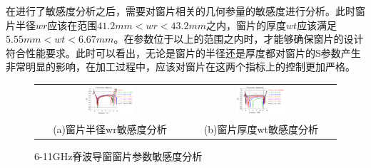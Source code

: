 \documentclass[master]{thesis-uestc}
\begin{document}
在进行了敏感度分析之后，需要对窗片相关的几何参量的敏感度进行分析。此时窗片半径\(wr\)应该在范围\(41.2mm<wr<43.2mm\)之内，窗片的厚度\(wt\)应该满足\(5.55mm<wt<6.67mm\)。在参数位于以上的范围之内时，才能够确保窗片的设计符合性能要求。此时可以看出，无论是窗片的半径还是厚度都对窗片的S参数产生非常明显的影响，在加工过程中，应该对窗片在这两个指标上的控制更加严格。
\begin{figure}[!htb]
    \small
    \centering
    \begin{tabular}{@{\ }c@{\ }c}
        \includegraphics[width=0.35\textwidth]{pic/chapter3/窗片半径wr扫参.png} & 
        \hspace{5pt}
        \includegraphics[width=0.35\textwidth]{pic/chapter3/窗片厚度wt扫参.png}     \\
        \mbox{\small (a)窗片半径wr敏感度分析}                                                                               & 
        \mbox{\small (b)窗片厚度wt敏感度分析}                                                                                  \\
    \end{tabular}
    \caption{6-11GHz脊波导窗窗片参数敏感度分析}
    \label{fig:X频段脊波导窗窗片参数敏感度分析}
\end{figure}
\end{document}
